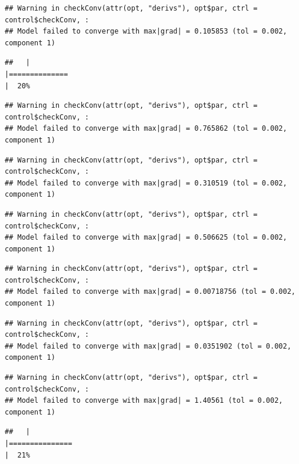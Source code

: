 \documentclass[
  12pt,
]{book}
\begin{document}
\begin{verbatim}
## Warning in checkConv(attr(opt, "derivs"), opt$par, ctrl = control$checkConv, :
## Model failed to converge with max|grad| = 0.105853 (tol = 0.002, component 1)
\end{verbatim}

\begin{verbatim}
##   |                                                                              |==============                                                        |  20%
\end{verbatim}

\begin{verbatim}
## Warning in checkConv(attr(opt, "derivs"), opt$par, ctrl = control$checkConv, :
## Model failed to converge with max|grad| = 0.765862 (tol = 0.002, component 1)
\end{verbatim}

\begin{verbatim}
## Warning in checkConv(attr(opt, "derivs"), opt$par, ctrl = control$checkConv, :
## Model failed to converge with max|grad| = 0.310519 (tol = 0.002, component 1)
\end{verbatim}

\begin{verbatim}
## Warning in checkConv(attr(opt, "derivs"), opt$par, ctrl = control$checkConv, :
## Model failed to converge with max|grad| = 0.506625 (tol = 0.002, component 1)
\end{verbatim}

\begin{verbatim}
## Warning in checkConv(attr(opt, "derivs"), opt$par, ctrl = control$checkConv, :
## Model failed to converge with max|grad| = 0.00718756 (tol = 0.002, component 1)
\end{verbatim}

\begin{verbatim}
## Warning in checkConv(attr(opt, "derivs"), opt$par, ctrl = control$checkConv, :
## Model failed to converge with max|grad| = 0.0351902 (tol = 0.002, component 1)
\end{verbatim}

\begin{verbatim}
## Warning in checkConv(attr(opt, "derivs"), opt$par, ctrl = control$checkConv, :
## Model failed to converge with max|grad| = 1.40561 (tol = 0.002, component 1)
\end{verbatim}

\begin{verbatim}
##   |                                                                              |===============                                                       |  21%
\end{verbatim}
\end{document}
